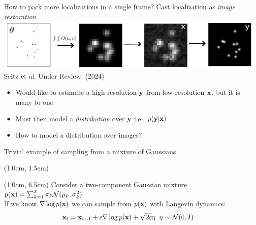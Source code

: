\documentclass{beamer}					%
\begin{document}
\begin{frame}{How to pack more localizations in a single frame?}
Cast localization as \emph{image restoration}
\vspace{1cm}
\includegraphics[width=\textwidth]{media/Generation.png}\\
Seitz et al. Under Review. (2024) \\
\vspace{1cm}
\begin{itemize}
\item Would like to estimate a high-resolution $\bold{y}$ from low-resolution $\bold{x}$, but it is many to one
\item Must then model a \emph{distribution} over $\bold{y}$ i.e., $p(\bold{y}|\bold{x})$
\item How to model a distribution over images?
\end{itemize}
\end{frame}

\begin{frame}{Trivial example of sampling from a mixture of Gaussians}
\begin{textblock*}{13cm}(1.0cm, 1.5cm)
\end{textblock*}
\begin{textblock*}{13cm}(1.0cm, 6.5cm)
Consider a two-component Gaussian mixture $p(\bold{x}) = \sum_{k=1}^{2}\pi_{k}\mathcal{N}(\mu_{k},\sigma_{k}^{2})$\\
\vspace{0.5cm}
If we know $\nabla\log p(\bold{x})$ we can sample from $p(\bold{x})$ with Langevin dynamics: 
\begin{equation*}
\bold{x}_{i} = \bold{x}_{i-1} + \epsilon \nabla\log p(\bold{x}) + \sqrt{2\epsilon}\eta \;\; \eta\sim \mathcal{N}(0,I)
\end{equation*}
\end{textblock*}
\end{frame}
\end{document}
